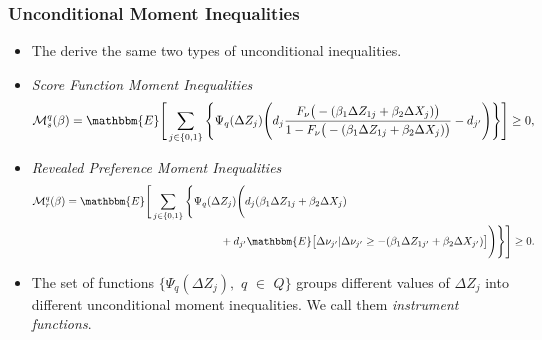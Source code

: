 \documentclass[notes=show]{beamer}
\begin{document}
\begin{frame}
\frametitle{Unconditional Moment Inequalities}

\begin{itemize}
	\item The derive the same two types of unconditional inequalities.
	\item \textit{Score Function Moment Inequalities}
	\small
	\begin{align*}
	\mathcal{M}^{q}_{s}(\beta)=\mathbbm{E}\Bigg[\sum_{j\in\{0,1\}}\Bigg\{\Psi_{q}(\Delta Z_{j})\Bigg(d_{j}\frac{F_{\nu}\big(-(\beta_{1}\Delta Z_{1j}+\beta_{2}\Delta X_{j})\big)}{1-F_{\nu}\big(-(\beta_{1}\Delta Z_{1j}+\beta_{2}\Delta X_{j})\big)}-d_{j'}\Bigg)\Bigg\}\Bigg]\geq 0,
	\end{align*}
	\normalsize
	\item \textit{Revealed Preference Moment Inequalities}
	\small
	\begin{align*}
	\mathcal{M}^{q}_{r}(\beta)=\mathbbm{E}\Bigg[\sum_{j\in\{0,1\}}\Bigg\{\Psi_{q}(\Delta &Z_{j})\Bigg(d_{j}(\beta_{1}\Delta Z_{1j}+\beta_{2}\Delta X_{j})\nonumber\\
	&+d_{j'}\mathbbm{E}\big[\Delta\nu_{j'}|\Delta\nu_{j'}\geq-(\beta_{1}\Delta Z_{1j'}+\beta_{2}\Delta X_{j'})\big]\Bigg)\Bigg\}\Bigg]\geq 0.
	\end{align*}
	\normalsize
	\item The set of functions $\{\Psi_{q}(\Delta Z_{j}),$ $q$ $\in$ $Q\}$ groups different values of $\Delta Z_{j}$ into different unconditional moment inequalities. We call them \textit{instrument functions}.
\end{itemize}
\end{frame}
\end{document}
